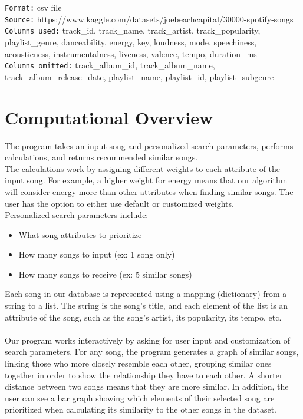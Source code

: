 \documentclass[fontsize=11pt]{article}
\begin{document}
\texttt{Format:} csv file\\
\texttt{Source:} https://www.kaggle.com/datasets/joebeachcapital/30000-spotify-songs\\
\texttt{Columns used:} track\_id, track\_name, track\_artist, track\_popularity, playlist\_genre, danceability, energy, key, loudness, mode, speechiness, acousticness, instrumentalness, liveness, valence, tempo, duration\_ms\\
\texttt{Columns omitted:} track\_album\_id, track\_album\_name, track\_album\_release\_date, playlist\_name, playlist\_id, playlist\_subgenre 


\section*{Computational Overview}

The program takes an input song and personalized search parameters, performs calculations, and returns recommended similar songs.\\
The calculations work by assigning different weights to each attribute of the input song. For example, a higher weight for energy means that our algorithm will consider energy more than other attributes when finding similar songs. The user has the option to either use default or customized weights.\\
Personalized search parameters include:
\begin{itemize}
    \item What song attributes to prioritize
    \item How many songs to input (ex: 1 song only)
    \item How many songs to receive (ex: 5 similar songs)
\end{itemize}
Each song in our database is represented using a mapping (dictionary) from a string to a list. The string is the song's title, and each element of the list is an attribute of the song, such as the song's artist, its popularity, its tempo, etc.\\
\\
Our program works interactively by asking for user input and customization of search parameters. For any song, the program generates a graph of similar songs, linking those who more closely resemble each other, grouping similar ones together in order to show the relationship they have to each other. A shorter distance between two songs means that they are more similar. In addition, the user can see a bar graph showing which elements of their selected song are prioritized when calculating its similarity to the other songs in the dataset.\\
\end{document}
